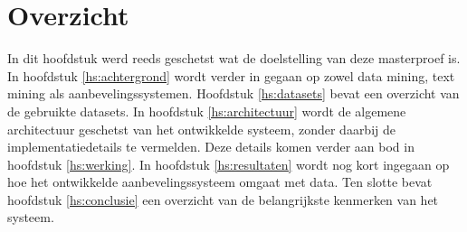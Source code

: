 \section{Overzicht}
In dit hoofdstuk werd reeds geschetst wat de doelstelling van deze masterproef is. In hoofdstuk \ref{hs:achtergrond} wordt verder in gegaan op zowel data mining, text mining als aanbevelingssystemen. Hoofdstuk \ref{hs:datasets} bevat een overzicht van de gebruikte datasets. In hoofdstuk \ref{hs:architectuur} wordt de algemene architectuur geschetst van het ontwikkelde systeem, zonder daarbij de implementatiedetails te vermelden. Deze details komen verder aan bod in hoofdstuk \ref{hs:werking}. In hoofdstuk \ref{hs:resultaten} wordt nog kort ingegaan op hoe het ontwikkelde aanbevelingssysteem omgaat met data. Ten slotte bevat hoofdstuk \ref{hs:conclusie} een overzicht van de belangrijkste kenmerken van het systeem.